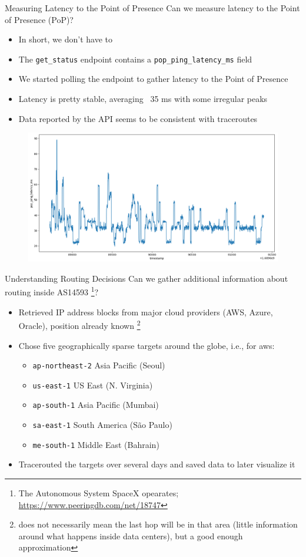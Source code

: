 \documentclass[NET,english,beameralt]{tumbeamer}
\begin{document}
\begin{frame}{Measuring Latency to the Point of Presence}
    Can we measure latency to the Point of Presence (PoP)?
    \begin{itemize}
        \item In short, we don't have to
        \item The \texttt{get\_status} endpoint contains a  \texttt{pop\_ping\_latency\_ms} field
        \item We started polling the endpoint to gather latency to the Point of Presence
        \pause
        \item Latency is pretty stable, averaging ~35 ms with some irregular peaks
        \item Data reported by the API seems to be consistent with traceroutes
    \end{itemize}
    \begin{figure}
        \centering
        \includegraphics[width=0.6\columnwidth]{pics/latency.png}
    \end{figure}
\end{frame}

\begin{frame}{Understanding Routing Decisions}
    Can we gather additional information about routing inside AS14593 
        \footnote{The Autonomous System SpaceX opearates; \url{https://www.peeringdb.com/net/18747}}?
    \begin{itemize}
        \item Retrieved IP address blocks from major cloud providers (AWS, Azure, Oracle), position already known
            \footnote{does not necessarily mean the last hop will be in that area (little information around what happens inside data centers), 
                        but a good enough approximation}
        \item Chose five geographically sparse targets around the globe, i.e., for aws:
            \begin{itemize}
                \item \texttt{ap-northeast-2} Asia Pacific (Seoul)
                \item \texttt{us-east-1} US East (N. Virginia)
                \item \texttt{ap-south-1} Asia Pacific (Mumbai)
                \item \texttt{sa-east-1} South America (São Paulo)
                \item \texttt{me-south-1} Middle East (Bahrain)
            \end{itemize}
        \item Tracerouted the targets over several days and saved data to later visualize it
    \end{itemize}
\end{frame}
\end{document}

